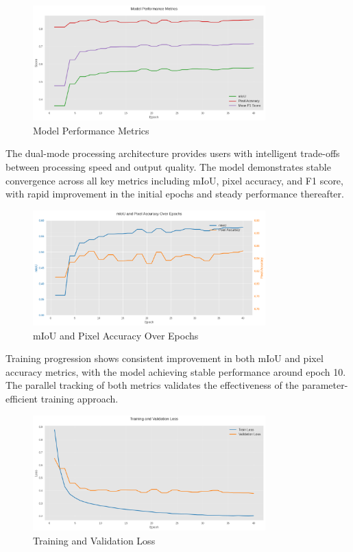 \documentclass[12pt,a4paper]{report}
\begin{document}
\begin{figure}[H]
\centering
\includegraphics[width=0.8\textwidth]{figures/model_performance_metrics.png}
\caption{Model Performance Metrics}
\label{fig:model_performance_metrics}
\end{figure}

The dual-mode processing architecture provides users with intelligent trade-offs between processing speed and output quality. The model demonstrates stable convergence across all key metrics including mIoU, pixel accuracy, and F1 score, with rapid improvement in the initial epochs and steady performance thereafter.

\begin{figure}[H]
\centering
\includegraphics[width=0.8\textwidth]{figures/miou_pixel_accuracy_epochs.png}
\caption{mIoU and Pixel Accuracy Over Epochs}
\label{fig:miou_pixel_accuracy}
\end{figure}

Training progression shows consistent improvement in both mIoU and pixel accuracy metrics, with the model achieving stable performance around epoch 10. The parallel tracking of both metrics validates the effectiveness of the parameter-efficient training approach.

\begin{figure}[H]
\centering
\includegraphics[width=0.8\textwidth]{figures/training_validation_loss.png}
\caption{Training and Validation Loss}
\label{fig:training_validation_loss}
\end{figure}
\end{document}
